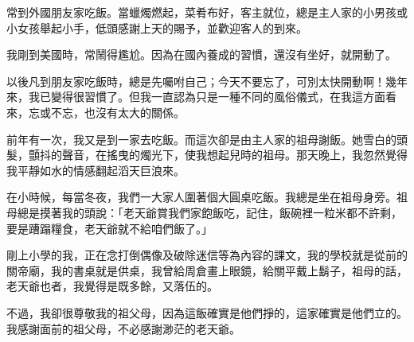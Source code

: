 
\begin{acknowledgement}

常到外國朋友家吃飯。當蠟燭燃起，菜肴布好，客主就位，總是主人家的小男孩或小女孩舉起小手，低頭感謝上天的賜予，並歡迎客人的到來。

我剛到美國時，常鬧得尷尬。因為在國內養成的習慣，還沒有坐好，就開動了。

以後凡到朋友家吃飯時，總是先囑咐自己；今天不要忘了，可別太快開動啊！幾年來，我已變得很習慣了。但我一直認為只是一種不同的風俗儀式，在我這方面看來，忘或不忘，也沒有太大的關係。

前年有一次，我又是到一家去吃飯。而這次卻是由主人家的祖母謝飯。她雪白的頭髮，顫抖的聲音，在搖曳的燭光下，使我想起兒時的祖母。那天晚上，我忽然覺得我平靜如水的情感翻起滔天巨浪來。

在小時候，每當冬夜，我們一大家人圍著個大圓桌吃飯。我總是坐在祖母身旁。祖母總是摸著我的頭說：「老天爺賞我們家飽飯吃，記住，飯碗裡一粒米都不許剩，要是蹧蹋糧食，老天爺就不給咱們飯了。」

剛上小學的我，正在念打倒偶像及破除迷信等為內容的課文，我的學校就是從前的關帝廟，我的書桌就是供桌，我曾給周倉畫上眼鏡，給關平戴上鬍子，祖母的話，老天爺也者，我覺得是既多餘，又落伍的。

不過，我卻很尊敬我的祖父母，因為這飯確實是他們掙的，這家確實是他們立的。我感謝面前的祖父母，不必感謝渺茫的老天爺。

\end{acknowledgement}